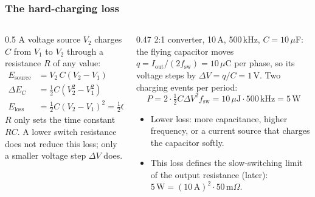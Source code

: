 \begin{frame}
	\frametitle{The hard-charging loss}
	\begin{columns}[T]
		\begin{column}{0.5\textwidth}
			\small
			A voltage source $V_2$ charges $C$ from $V_1$ to $V_2$ through a resistance $R$ of any value:
			\begin{align*}
				E_\mathrm{source} & =V_2\,C(V_2-V_1)                          \\
				\Delta E_C        & =\tfrac12C(V_2^2-V_1^2)                     \\
				E_\mathrm{loss}   & =\tfrac12C(V_2-V_1)^2=\tfrac12C\,\Delta V^2
			\end{align*}
			$R$ only sets the time constant $RC$. A lower switch resistance does not reduce this loss; only a smaller voltage step $\Delta V$ does.
		\end{column}
		\begin{column}{0.47\textwidth}
			\small
			2:1 converter, 10\,A, 500\,kHz, $C=10\,\mu$F: the flying capacitor moves $q=I_\mathrm{out}/(2f_\mathrm{sw})=10\,\mu$C per phase, so its voltage steps by $\Delta V=q/C=1$\,V. Two charging events per period:
			\begin{equation*}
				P=2\cdot\tfrac12C\Delta V^2f_\mathrm{sw}=10\,\mu\mathrm{J}\cdot500\,\mathrm{kHz}=5\,\mathrm{W}
			\end{equation*}
			\begin{itemize}
				\item Lower loss: more capacitance, higher frequency, or a current source that charges the capacitor softly.
				\item This loss defines the slow-switching limit of the output resistance (later): $5\,\mathrm{W}=(10\,\mathrm{A})^2\cdot50\,\mathrm{m}\Omega$.
			\end{itemize}
		\end{column}
	\end{columns}
\end{frame}

